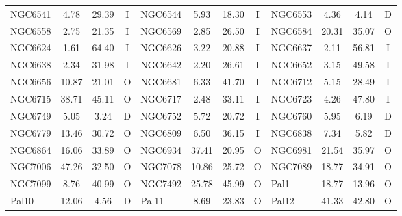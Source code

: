 \begin{table}
\begin{tabular}{l | c | c | c | l | c | c | c | l | c | c | c}
                NGC6541 &   4.78 &  29.39 &              I &
                NGC6544 &   5.93 &  18.30 &              I &
                NGC6553 &   4.36 &   4.14 &              D \\
                NGC6558 &   2.75 &  21.35 &              I &
                NGC6569 &   2.85 &  26.50 &              I &
                NGC6584 &  20.31 &  35.07 &              O \\
                NGC6624 &   1.61 &  64.40 &              I &
                NGC6626 &   3.22 &  20.88 &              I &
                NGC6637 &   2.11 &  56.81 &              I \\
                NGC6638 &   2.34 &  31.98 &              I &
                NGC6642 &   2.20 &  26.61 &              I &
                NGC6652 &   3.15 &  49.58 &              I \\
                NGC6656 &  10.87 &  21.01 &              O &
                NGC6681 &   6.33 &  41.70 &              I &
                NGC6712 &   5.15 &  28.49 &              I \\
                NGC6715 &  38.71 &  45.11 &              O &
                NGC6717 &   2.48 &  33.11 &              I &
                NGC6723 &   4.26 &  47.80 &              I \\
                NGC6749 &   5.05 &   3.24 &              D &
                NGC6752 &   5.72 &  20.72 &              I &
                NGC6760 &   5.95 &   6.19 &              D \\
                NGC6779 &  13.46 &  30.72 &              O &
                NGC6809 &   6.50 &  36.15 &              I &
                NGC6838 &   7.34 &   5.82 &              D \\
                NGC6864 &  16.06 &  33.89 &              O &
                NGC6934 &  37.41 &  20.95 &              O &
                NGC6981 &  21.54 &  35.97 &              O \\
                NGC7006 &  47.26 &  32.50 &              O &
                NGC7078 &  10.86 &  25.72 &              O &
                NGC7089 &  18.77 &  34.91 &              O \\
                NGC7099 &   8.76 &  40.99 &              O &
                NGC7492 &  25.78 &  45.99 &              O &
                    Pal1 &  18.77 &  13.96 &              O \\
                    Pal10 &  12.06 &   4.56 &              D &
                    Pal11 &   8.69 &  23.83 &              O &
                    Pal12 &  41.33 &  42.80 &              O \\

\end{tabular}
\end{table}
